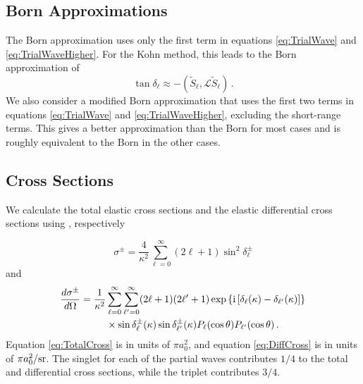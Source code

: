 \documentclass[preprint,showpacs,preprintnumbers,amsmath,amssymb]{revtex4}
\newcommand{\ii}{{\rm{i}}}
\begin{document}
\subsection{Born Approximations}
The Born approximation \cite{?} uses only the first term in equations \ref{eq:TrialWave} and \ref{eq:TrialWaveHigher}. For the Kohn method, this leads to the Born approximation of
\begin{equation}
\label{eq:Born}
\tan\delta_\ell \approx -(\widetilde{S}_\ell,\mathcal{L}\widetilde{S}_\ell )\, .
\end{equation}
We also consider a modified Born approximation that uses the first two terms in equations \ref{eq:TrialWave} and \ref{eq:TrialWaveHigher}, excluding the short-range terms. This gives a better approximation than the Born for most cases and is roughly equivalent to the Born in the other cases.

\subsection{Cross Sections}

We calculate the total elastic cross sections and the elastic differential cross sections using \cite{Bransden2003}, respectively


\begin{equation}
\label{eq:TotalCross}
\sigma^\pm = \frac{4}{\kappa^2} \sum_{\ell=0}^\infty (2\ell+1) \sin^2 \delta_\ell^\pm
\end{equation}
and
\begin{align}
\label{eq:DiffCross}
\nonumber \frac{d\sigma^\pm}{d\Omega} = \frac{1}{\kappa^2} & \sum_{\ell=0}^\infty \sum_{\ell^\prime=0}^\infty (2\ell+1)(2\ell^\prime+1) \exp\left\{\ii \left[\delta_\ell(\kappa) - \delta_{\ell^\prime}(\kappa) \right] \right\} \\
& \times \sin\delta_\ell^\pm(\kappa) \sin\delta_{\ell^\prime}^\pm(\kappa) P_\ell(\cos\theta) P_{\ell^\prime}(\cos\theta)\,.
\end{align}
Equation \ref{eq:TotalCross} is in units of $\pi a_0^2$, and equation \ref{eq:DiffCross} is in units of $\pi a_0^2 / \rm{sr}$. The singlet for each of the partial waves contributes $1/4$ to the total and differential cross sections, while the triplet contributes $3/4$.
\end{document}
